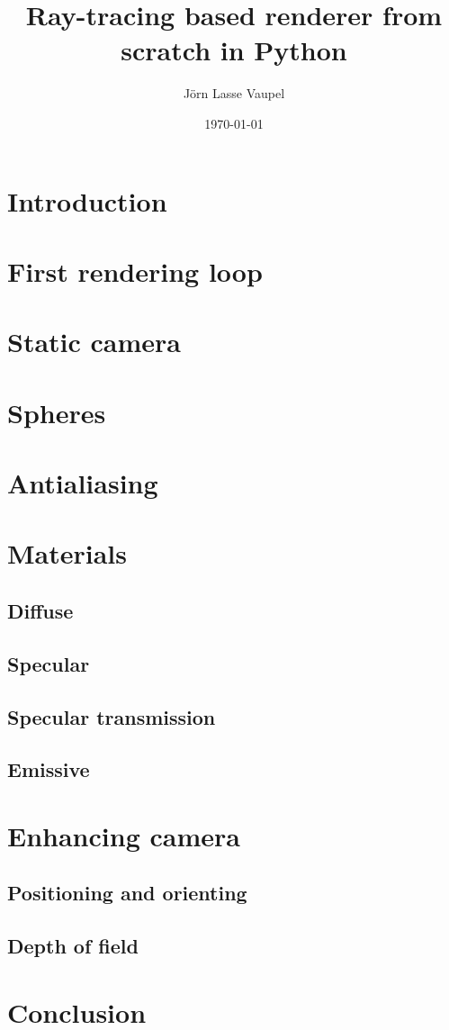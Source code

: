\documentclass[]{article}
\title{Ray-tracing based renderer from scratch in Python}
\author{Jörn Lasse Vaupel}
\date{\today}
\begin{document}
	
	\maketitle
	\newpage
	\tableofcontents
	
	\begin{abstract}
		
	\end{abstract}
	
	\section{Introduction}	
	\section{First rendering loop}
	\section{Static camera}
	\section{Spheres}
	\section{Antialiasing}
	\section{Materials}
		\subsection{Diffuse}
		\subsection{Specular}
		\subsection{Specular transmission}
		\subsection{Emissive}
	\section{Enhancing camera}
		\subsection{Positioning and orienting}
		\subsection{Depth of field}
	\section{Conclusion}
	
	\clearpage
	{}
	
		
\end{document}
